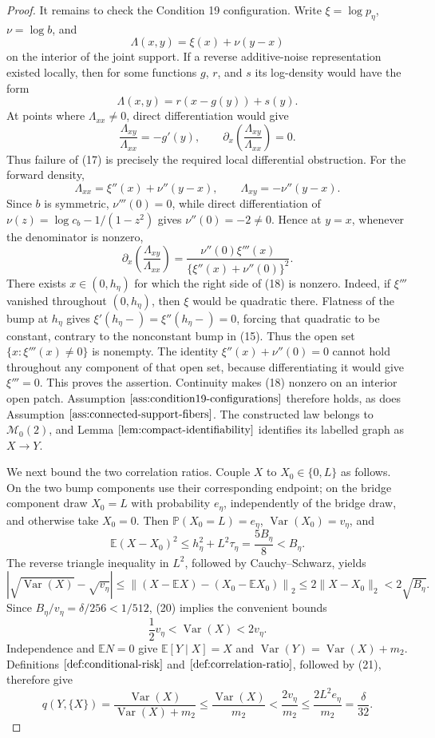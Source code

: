 \documentclass{article}
\begin{document}
\begin{proof}
It remains to check the Condition 19 configuration.  Write \(\xi=\log p_\eta\), \(\nu=\log b\), and
\[
 \Lambda(x,y)=\xi(x)+\nu(y-x)
\]
on the interior of the joint support.  If a reverse additive-noise representation existed locally, then for some functions \(g\), \(r\), and \(s\) its log-density would have the form
\[
 \Lambda(x,y)=r(x-g(y))+s(y).
\]
At points where \(\Lambda_{xx}\ne0\), direct differentiation would give
\[
 \frac{\Lambda_{xy}}{\Lambda_{xx}}=-g'(y),
 \qquad
 \partial_x\left(\frac{\Lambda_{xy}}{\Lambda_{xx}}\right)=0. \tag{17}
\]
Thus failure of (17) is precisely the required local differential obstruction.  For the forward density,
\[
 \Lambda_{xx}=\xi''(x)+\nu''(y-x),
 \qquad \Lambda_{xy}=-\nu''(y-x).
\]
Since \(b\) is symmetric, \(\nu'''(0)=0\), while direct differentiation of \(\nu(z)=\log c_b-1/(1-z^2)\) gives \(\nu''(0)=-2\ne0\).  Hence at \(y=x\), whenever the denominator is nonzero,
\[
 \partial_x\left(\frac{\Lambda_{xy}}{\Lambda_{xx}}\right)
 =\frac{\nu''(0)\xi'''(x)}{\{\xi''(x)+\nu''(0)\}^2}. \tag{18}
\]
There exists \(x\in(0,h_\eta)\) for which the right side of (18) is nonzero.  Indeed, if \(\xi'''\) vanished throughout \((0,h_\eta)\), then \(\xi\) would be quadratic there.  Flatness of the bump at \(h_\eta\) gives \(\xi'(h_\eta-)=\xi''(h_\eta-)=0\), forcing that quadratic to be constant, contrary to the nonconstant bump in (15).  Thus the open set \(\{x:\xi'''(x)\ne0\}\) is nonempty.  The identity \(\xi''(x)+\nu''(0)=0\) cannot hold throughout any component of that open set, because differentiating it would give \(\xi'''=0\).  This proves the assertion.  Continuity makes (18) nonzero on an interior open patch.  Assumption \(\ref{ass:condition19-configurations}\) therefore holds, as does Assumption \(\ref{ass:connected-support-fibers}\).  The constructed law belongs to \(\mathcal M_0(2)\), and Lemma \(\ref{lem:compact-identifiability}\) identifies its labelled graph as \(X\to Y\).

We next bound the two correlation ratios.  Couple \(X\) to \(X_0\in\{0,L\}\) as follows.  On the two bump components use their corresponding endpoint; on the bridge component draw \(X_0=L\) with probability \(e_\eta\), independently of the bridge draw, and otherwise take \(X_0=0\).  Then \(\mathbb P(X_0=L)=e_\eta\), \(\operatorname{Var}(X_0)=v_\eta\), and
\[
 \mathbb E(X-X_0)^2
 \le h_\eta^2+L^2\tau_\eta
 =\frac{5B_\eta}{8}<B_\eta. \tag{19}
\]
The reverse triangle inequality in \(L^2\), followed by Cauchy--Schwarz, yields
\[
 \left|\sqrt{\operatorname{Var}(X)}-\sqrt{v_\eta}\right|
 \le \left\|(X-\mathbb EX)-(X_0-\mathbb EX_0)\right\|_2
 \le2\|X-X_0\|_2<2\sqrt{B_\eta}. \tag{20}
\]
Since \(B_\eta/v_\eta=\delta/256<1/512\), (20) implies the convenient bounds
\[
 \frac12v_\eta<\operatorname{Var}(X)<2v_\eta. \tag{21}
\]
Independence and \(\mathbb EN=0\) give \(\mathbb E[Y\mid X]=X\) and \(\operatorname{Var}(Y)=\operatorname{Var}(X)+m_2\).  Definitions \(\ref{def:conditional-risk}\) and \(\ref{def:correlation-ratio}\), followed by (21), therefore give
\[
 q(Y,\{X\})
 =\frac{\operatorname{Var}(X)}{\operatorname{Var}(X)+m_2}
 \le\frac{\operatorname{Var}(X)}{m_2}
 <\frac{2v_\eta}{m_2}
 \le\frac{2L^2e_\eta}{m_2}
 =\frac{\delta}{32}. \tag{22}
\]


\end{proof}
\end{document}
